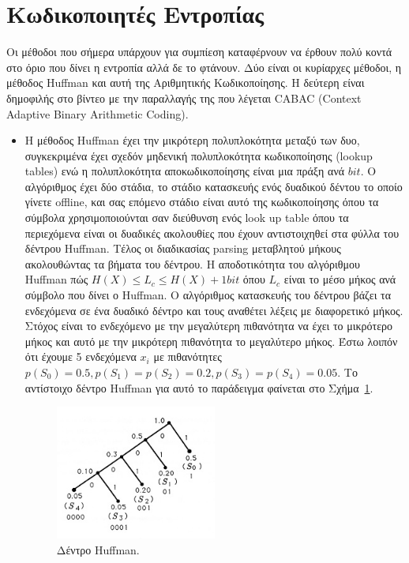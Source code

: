 \section{Κωδικοποιητές Εντροπίας}
\label{section:sect33}

\indent Οι μέθοδοι που σήμερα υπάρχουν για συμπίεση καταφέρνουν να έρθουν πολύ κοντά στο όριο που δίνει η εντροπία αλλά δε το φτάνουν. Δύο είναι οι κυρίαρχες μέθοδοι, η μέθοδος Huffman και αυτή της Αριθμητικής Κωδικοποίησης. Η δεύτερη είναι δημοφιλής στο βίντεο με την παραλλαγής της που λέγεται CABAC (Context Adaptive Binary Arithmetic Coding).
\begin{itemize}
  \item Η μέθοδος Huffman έχει την μικρότερη πολυπλοκότητα μεταξύ των δυο, συγκεκριμένα έχει σχεδόν μηδενική πολυπλοκότητα κωδικοποίησης (lookup tables) ενώ η πολυπλοκότητα αποκωδικοποίησης είναι μια πράξη ανά $bit$. Ο αλγόριθμος έχει δύο στάδια, το στάδιο κατασκευής ενός δυαδικού δέντου το οποίο γίνετε offline, και σας επόμενο στάδιο είναι αυτό της κωδικοποίησης όπου τα σύμβολα χρησιμοποιούνται σαν διεύθυνση ενός look up table όπου τα περιεχόμενα είναι οι δυαδικές ακολουθίες που έχουν αντιστοιχηθεί στα φύλλα του δέντρου Huffman. Τέλος οι διαδικασίας parsing μεταβλητού μήκους ακολουθώντας τα βήματα του δέντρου. Η αποδοτικότητα του αλγόριθμου Huffman πώς $ H(X) \leq L_c \leq H(X)+1bit  $ όπου $L_c$ είναι το μέσο μήκος ανά σύμβολο που δίνει ο Huffman. Ο αλγόριθμος κατασκευής του δέντρου βάζει τα ενδεχόμενα σε ένα δυαδικό δέντρο και τους αναθέτει λέξεις με διαφορετικό μήκος. Στόχος είναι το ενδεχόμενο με την μεγαλύτερη πιθανότητα να έχει το μικρότερο μήκος και αυτό με την μικρότερη πιθανότητα το μεγαλύτερο μήκος. Έστω λοιπόν ότι έχουμε 5 ενδεχόμενα $x_i$ με πιθανότητες $p(S_0) = 0.5, p(S_1)=p(S_2)=0.2, p(S_3)=p(S_4)=0.05$. Το αντίστοιχο δέντρο Huffman για αυτό το παράδειγμα φαίνεται στο Σχήμα~\ref{fig:huffman}.
      \begin{figure}[h!]
          \centering
          \includegraphics[width=0.5\textwidth]{chapter3/huffman.jpg}
          \caption{Δέντρο Huffman. \cite{misc:huffman}}
          \label{fig:huffman}
      \end{figure}


\end{itemize}
